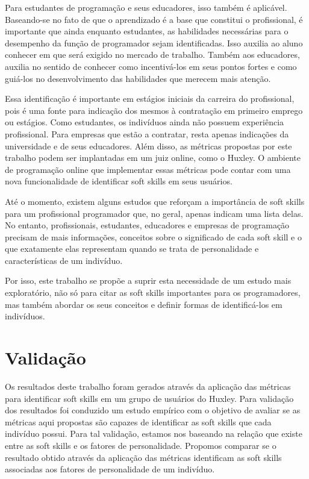 Para estudantes de programação e seus educadores, isso também é aplicável. Baseando-se no fato de que o aprendizado é a base que constitui o profissional, é importante que ainda enquanto estudantes, as habilidades necessárias para o desempenho da função de programador sejam identificadas. Isso auxilia ao aluno conhecer em que será exigido no mercado de trabalho. Também aos educadores, auxilia no sentido de conhecer como incentivá-los em seus pontos fortes e como guiá-los no desenvolvimento das habilidades que merecem mais atenção.

Essa identificação é importante em estágios iniciais da carreira do profissional, pois é uma fonte para indicação dos mesmos à contratação em primeiro emprego ou estágios. Como estudantes, os indivíduos ainda não possuem experiência profissional. Para empresas que estão a contratar, resta apenas indicações da universidade e de seus educadores.
Além disso, as métricas propostas por este trabalho podem ser implantadas em um juiz online, como o Huxley. O ambiente de programação online que implementar essas métricas pode contar com uma nova funcionalidade de identificar soft skills em seus usuários.

Até o momento, existem alguns estudos que reforçam a importância de soft skills para um profissional programador que, no geral, apenas indicam uma lista delas. No entanto, profissionais, estudantes, educadores e empresas de programação precisam de mais informações, conceitos sobre o significado de cada soft skill e o que exatamente elas representam quando se trata de personalidade e características de um indivíduo.

Por isso, este trabalho se propõe a suprir esta necessidade de um estudo mais exploratório, não só para citar as soft skills importantes para os programadores, mas também abordar os seus conceitos e definir formas de identificá-los em indivíduos.

\section{Validação}

Os resultados deste trabalho foram gerados através da aplicação das métricas para identificar soft skills em um grupo de usuários do Huxley. Para validação dos resultados foi conduzido um estudo empírico com o objetivo de avaliar se as métricas aqui propostas são capazes de identificar as soft skills que cada indivíduo possui.
Para tal validação, estamos nos baseando na relação que existe entre as soft skills e os fatores de personalidade. Propomos comparar se o resultado obtido através da aplicação das métricas identificam as soft skills associadas aos fatores de personalidade de um indivíduo.

